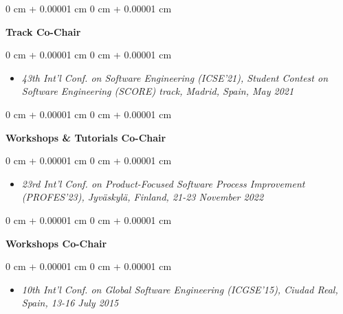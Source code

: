 \documentclass[10pt, a4paper]{article}
\newenvironment{highlights}{
    \begin{itemize}[
        topsep=0.10 cm,
        parsep=0.10 cm,
        partopsep=0pt,
        itemsep=0pt,
        leftmargin=0 cm + 10pt
    ]
}{
    \end{itemize}
} %
\newenvironment{onecolentry}{
    \begin{adjustwidth}{
        0 cm + 0.00001 cm
    }{
        0 cm + 0.00001 cm
    }
}{
    \end{adjustwidth}
} %
\begin{document}
        \vspace{0.2 cm}

        \begin{onecolentry}
            \textbf{Track Co-Chair}\end{onecolentry}

        \vspace{0.10 cm}
        \begin{onecolentry}
            \begin{highlights}
                \item \textit{43th Int’l Conf. on Software Engineering (ICSE’21), Student Contest on Software Engineering (SCORE) track, Madrid, Spain, May 2021}
            \end{highlights}
        \end{onecolentry}


        \vspace{0.2 cm}

        \begin{onecolentry}
            \textbf{Workshops \& Tutorials Co-Chair}\end{onecolentry}

        \vspace{0.10 cm}
        \begin{onecolentry}
            \begin{highlights}
                \item \textit{23rd Int’l Conf. on Product-Focused Software Process Improvement (PROFES’23), Jyväskylä, Finland, 21-23 November 2022}
            \end{highlights}
        \end{onecolentry}


        \vspace{0.2 cm}

        \begin{onecolentry}
            \textbf{Workshops Co-Chair}\end{onecolentry}

        \vspace{0.10 cm}
        \begin{onecolentry}
            \begin{highlights}
                \item \textit{10th Int’l Conf. on Global Software Engineering (ICGSE'15), Ciudad Real, Spain, 13-16 July 2015}
            \end{highlights}
        \end{onecolentry}
\end{document}
